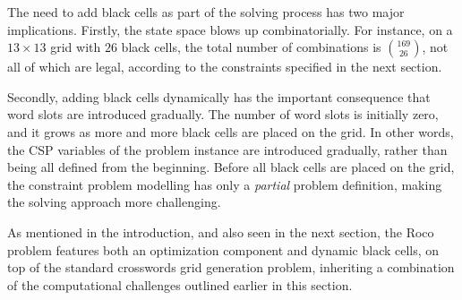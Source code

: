 The need to add black cells as part of the solving process has two 
major implications.
Firstly, the state space blows up combinatorially.
For instance, on a $13 \times 13$ grid with $26$
black cells, the total number of combinations is $169 \choose 26$,
not all of which are legal, according to the constraints
specified in the next section.

Secondly, adding black cells dynamically has the important consequence that
word slots are introduced gradually.
The number of word slots is initially zero, and it grows
as more and more black cells are placed on the grid.
In other words, the CSP variables of the problem instance are introduced gradually,
rather than being all defined from the beginning.
Before all black cells are placed on the grid, 
the constraint problem modelling has only a \emph{partial} problem definition,
making the solving approach more challenging.

As mentioned in the introduction, and also seen in the next section, the {\sc Roco} problem features both 
an optimization component and dynamic black cells, on top of the
standard crosswords grid generation problem,
inheriting a combination of 
the computational challenges outlined earlier in this section.